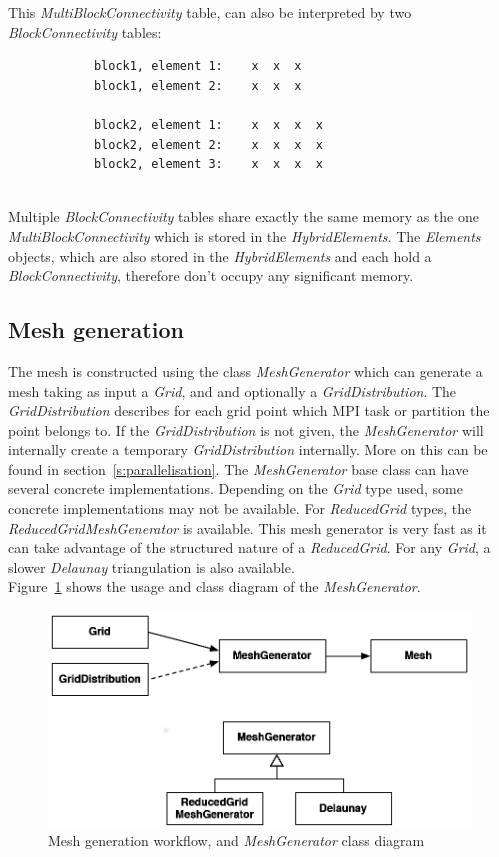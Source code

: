 This \emph{MultiBlockConnectivity} table, can also be interpreted by two \emph{BlockConnectivity} tables:\\[10pt]
\begin{minipage}{\textwidth}
\begin{verbatim}
            block1, element 1:    x  x  x
            block1, element 2:    x  x  x
                                 
            block2, element 1:    x  x  x  x
            block2, element 2:    x  x  x  x
            block2, element 3:    x  x  x  x
\end{verbatim}
\end{minipage}\\[10pt]
Multiple \emph{BlockConnectivity} tables share exactly the same memory as the
one \emph{MultiBlockConnectivity} which is stored in the \emph{HybridElements}.
The \emph{Elements} objects, which are also stored in the \emph{HybridElements}
and each hold a \emph{BlockConnectivity}, therefore don't occupy any 
significant memory.

\subsection{Mesh generation}
%
The mesh is constructed using the class \emph{MeshGenerator} which can generate
a mesh taking as input a \emph{Grid}, and and optionally a
\emph{GridDistribution}. The \emph{GridDistribution} describes for each grid
point which MPI task or partition the point belongs to. If the
\emph{GridDistribution} is not given, the \emph{MeshGenerator} will internally
create a temporary \emph{GridDistribution} internally. More on this can be
found in section~\ref{s:parallelisation}.
The \emph{MeshGenerator} base class can have several concrete implementations.
Depending on the \emph{Grid} type used, some concrete implementations may not
be available. For \emph{ReducedGrid} types, the \emph{ReducedGridMeshGenerator}
is available. This mesh generator is very fast as it can take advantage of the
structured nature of a \emph{ReducedGrid}. For any \emph{Grid}, a slower
\emph{Delaunay} triangulation is also available.\\
%
Figure~\ref{fig:meshgen} shows the usage and class diagram of the
\emph{MeshGenerator}.
%
\begin{figure}
\centering
\includegraphics[scale=0.25]{imgs/mesh1.png}
\caption{Mesh generation workflow, and \emph{MeshGenerator} class diagram
\label{fig:meshgen}}
\end{figure}


